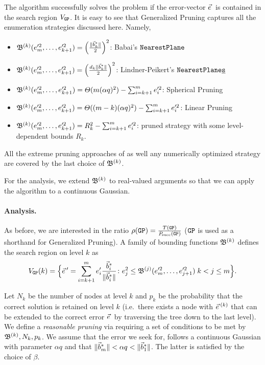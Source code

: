 The algorithm successfully solves the \LWE problem if the \LWE error-vector $\evec$ is contained in the search region $V_{\texttt{GP}}$. It is easy to see that Generalized Pruning captures all the enumeration strategies discussed here. Namely,

\begin{itemize}
	\item $\mathfrak{B}^{(k)}(e'^2_m, \ldots, e'^2_{k+1}) = \left( \frac{\| \vec b^*_k \|}{2} \right)^2 $: Babai's $\texttt{NearestPlane}$
	\item $\mathfrak{B}^{(k)}(e'^2_m, \ldots, e'^2_{k+1}) = \left( \frac{d_k \| \vec b^*_k \|}{2} \right)^2 $: Lindner-Peikert's $\texttt{NearestPlane\underline{s}}$
	\item $\mathfrak{B}^{(k)}(e'^2_m, \ldots, e'^2_{k+1}) = \varTheta(m (\alpha q)^2) - \sum_{i=k+1}^m e'^2_i$: Spherical Pruning
	\item $\mathfrak{B}^{(k)}(e'^2_m, \ldots, e'^2_{k+1}) = \varTheta( (m-k)(\alpha q)^2) - \sum_{i=k+1}^m e'^2_i $: Linear Pruning
	\item $\mathfrak{B}^{(k)}(e'^2_m, \ldots, e'^2_{k+1}) = R_k^2 -  \sum_{i=k+1}^m e'^2_i$: pruned strategy with some level-dependent bounds $R_k$.  
\end{itemize}
 
All the extreme pruning approaches of \cite{EC:GamNguReg10} as well any numerically optimized strategy are covered by the last choice of $\mathfrak{B}^{(k)}$.

For the analysis, we extend $\mathfrak{B}^{(k)}$ to real-valued arguments so that we can apply the algorithm to a continuous Gaussian.

\paragraph{Analysis.} As before, we are interested in the ratio $\rho(\texttt{GP}) = \frac{T(\texttt{GP})}{P\mkern-4mu_{\mbox{\tiny succ}}(\texttt{GP})}$ ($\texttt{GP}$ is used as a shorthand for Generalized Pruning). A family of bounding functions $\mathfrak{B}^{(k)}$ defines the search region on level $k$ as
\begin{equation}\label{eq:VGP}
	V_{\GP}(k) =  \Bigl\{ \evec' = \sum_{i=k+1}^m e'_i \frac{\wbvec_i }{\| \wbvec_i \| } \colon e_j^2 \leq \B^{(j)}(e'^2_m, \ldots, e'^2_{j+1}) \;  k < j \leq m \Bigr\}.
\end{equation}

Let $N_k$ be the number of nodes at level $k$ and $p_k$ be the probability that the correct solution is retained on level $k$ (i.e.\ there exists a node with $\evec^{(k)}$ that can be extended to the correct \LWE error $\evec$ by traversing the tree down to the last level). We define a \emph{reasonable pruning} via requiring a set of conditions to be met by $\mathfrak{B}^{(k)}, N_k,  p_k$. We assume that the error we seek for, follows a continuous Gaussian with parameter $\alpha q$ and that $ \| \vec b^*_m \| < \alpha q < \| \vec b^*_1 \| $. The latter is satisfied by the choice of $\beta$.

